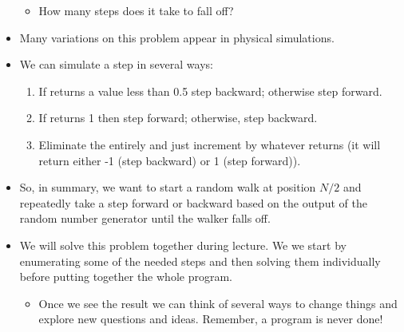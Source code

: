 \documentclass[letterpaper,10pt,english]{sphinxmanual}
\begin{document}
\begin{itemize}
\begin{itemize}
\begin{itemize}
\end{itemize}

\item {} 
How many steps does it take to fall off?

\end{itemize}

\item {} 
Many variations on this problem appear in physical simulations.

\item {} 
We can simulate a step in several ways:
\begin{enumerate}
\item {} 
If  returns a value less than 0.5 step backward;
otherwise step forward.

\item {} 
If  returns 1 then step forward; otherwise,
step backward.

\item {} 
Eliminate the  entirely and just increment by whatever 
returns (it will return either -1 (step backward) or 1 (step forward)).

\end{enumerate}

\item {} 
So, in summary, we want to start a random walk at position \(N/2\) and
repeatedly take a step forward or backward based on the
output of the random number generator until the walker falls off.

\item {} 
We will solve this problem together during lecture.
We we start by enumerating some of the needed steps and then
solving them individually before putting together the whole
program.
\begin{itemize}
\item {} 
Once we see the result we can think of several ways to change
things and explore new questions and ideas.  Remember, a program
is never done!

\end{itemize}

\end{itemize}
\end{document}
